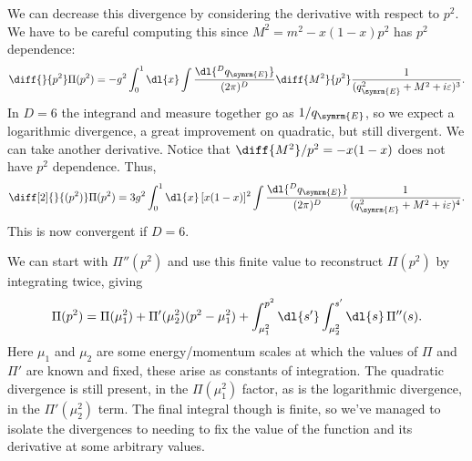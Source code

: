 \documentclass[fleqn]{NotesClass}
\begin{document}
    We can decrease this divergence by considering the derivative with respect to \(p^2\).
    We have to be careful computing this since \(M^2 = m^2 - x(1 - x)p^2\) has \(p^2\) dependence:
    \begin{equation}
        \diff{}{p^2} \Pi(p^2) = -g^2 \int_0^1 \dl{x} \int \frac{\dl{^Dq_{\symrm{E}}}}{(2\pi)^D} \diff{M^2}{p^2} \frac{1}{(q_{\symrm{E}}^2 + M^2 + i\varepsilon)^3}.
    \end{equation}
    In \(D = 6\) the integrand and measure together go as \(1/q_{\symrm{E}}\), so we expect a logarithmic divergence, a great improvement on quadratic, but still divergent.
    We can take another derivative.
    Notice that \(\diff{M^2}/{p^2} = -x(1 - x)\) does not have \(p^2\) dependence.
    Thus,
    \begin{equation}
        \diff[2]{}{(p^2)} \Pi(p^2) = 3g^2 \int_0^1 \dl{x} \, [x(1 - x)]^2 \int \frac{\dl{^Dq_{\symrm{E}}}}{(2\pi)^D} \frac{1}{(q_{\symrm{E}}^2 + M^2 + i\varepsilon)^4}.
    \end{equation}
    This is now convergent if \(D = 6\).
    
    We can start with \(\Pi''(p^2)\) and use this finite value to reconstruct \(\Pi(p^2)\) by integrating twice, giving
    \begin{equation}
        \Pi(p^2) = \Pi(\mu_1^2) + \Pi'(\mu_2^2) (p^2 - \mu_1^2) + \int_{\mu_1^2}^{p^2} \dl{s'} \int_{\mu_2^2}^{s'} \dl{s} \, \Pi''(s).
    \end{equation}
    Here \(\mu_1\) and \(\mu_2\) are some energy/momentum scales at which the values of \(\Pi\) and \(\Pi'\) are known and fixed, these arise as constants of integration.
    The quadratic divergence is still present, in the \(\Pi(\mu_1^2)\) factor, as is the logarithmic divergence, in the \(\Pi'(\mu_2^2)\) term.
    The final integral though is finite, so we've managed to isolate the divergences to needing to fix the value of the function and its derivative at some arbitrary values.
    
\end{document}
